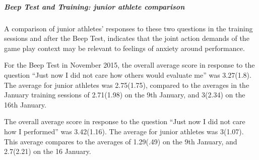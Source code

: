 \begin{CJK}{UTF8}{gbsn}
\subparagraph{Beep Test and Training: junior athlete comparison }
A comparison of junior athletes' responses to these two questions in the training sessions and after the Beep Test, indicates that the joint action demands of the game play context may be relevant to feelings of anxiety around performance.

For the Beep Test in November 2015, the overall average score in response to the question ``Just now I did not care how others would evaluate me'' was 3.27(1.8).  The average for junior athletes was 2.75(1.75), compared to the averages in the January training sessions of 2.71(1.98) on the 9th January, and 3(2.34) on the 16th January.

The overall average score in response to the question ``Just now I did not care how I performed'' was 3.42(1.16).  The average for junior athletes was 3(1.07).  This average compares to the averages of 1.29(.49) on the 9th January, and 2.7(2.21) on the 16 January.














\end{CJK}
